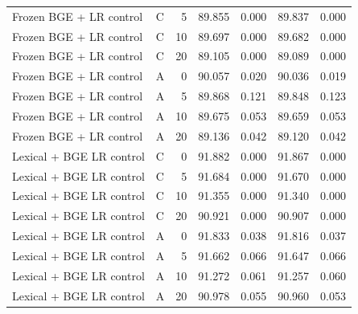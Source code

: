 \begin{longtable}{llrrrrr}
Frozen BGE + LR control & C & 5 & 89.855 & 0.000 & 89.837 & 0.000 \\
Frozen BGE + LR control & C & 10 & 89.697 & 0.000 & 89.682 & 0.000 \\
Frozen BGE + LR control & C & 20 & 89.105 & 0.000 & 89.089 & 0.000 \\
Frozen BGE + LR control & A & 0 & 90.057 & 0.020 & 90.036 & 0.019 \\
Frozen BGE + LR control & A & 5 & 89.868 & 0.121 & 89.848 & 0.123 \\
Frozen BGE + LR control & A & 10 & 89.675 & 0.053 & 89.659 & 0.053 \\
Frozen BGE + LR control & A & 20 & 89.136 & 0.042 & 89.120 & 0.042 \\
Lexical + BGE LR control & C & 0 & 91.882 & 0.000 & 91.867 & 0.000 \\
Lexical + BGE LR control & C & 5 & 91.684 & 0.000 & 91.670 & 0.000 \\
Lexical + BGE LR control & C & 10 & 91.355 & 0.000 & 91.340 & 0.000 \\
Lexical + BGE LR control & C & 20 & 90.921 & 0.000 & 90.907 & 0.000 \\
Lexical + BGE LR control & A & 0 & 91.833 & 0.038 & 91.816 & 0.037 \\
Lexical + BGE LR control & A & 5 & 91.662 & 0.066 & 91.647 & 0.066 \\
Lexical + BGE LR control & A & 10 & 91.272 & 0.061 & 91.257 & 0.060 \\
Lexical + BGE LR control & A & 20 & 90.978 & 0.055 & 90.960 & 0.053 \\
\bottomrule\end{longtable}

